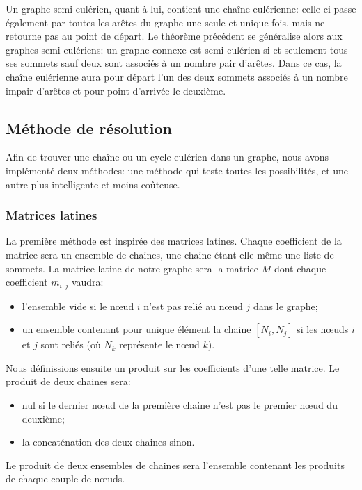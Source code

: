 \documentclass{scrartcl}
\begin{document}
    Un graphe semi-eulérien, quant à lui, contient une chaîne eulérienne:
    celle-ci passe également par toutes les arêtes du graphe une seule et
    unique fois, mais ne retourne pas au point de départ. Le théorème précédent
    se généralise alors aux graphes semi-eulériens: un graphe connexe est
    semi-eulérien si et seulement tous ses sommets sauf deux sont associés à un
    nombre pair d'arêtes. Dans ce cas, la chaîne eulérienne aura pour départ
    l'un des deux sommets associés à un nombre impair d'arêtes et pour point
    d'arrivée le deuxième.

  \subsection{Méthode de résolution}
    Afin de trouver une chaîne ou un cycle eulérien dans un graphe, nous avons
    implémenté deux méthodes: une méthode qui teste toutes les possibilités,
    et une autre plus intelligente et moins coûteuse.

    \subsubsection{Matrices latines}
      La première méthode est inspirée des matrices latines. Chaque coefficient
      de la matrice sera un ensemble de chaines, une chaine étant elle-même une
      liste de sommets. La matrice latine de notre graphe sera la matrice $M$
      dont chaque coefficient $m_{i,j}$ vaudra:
      \begin{itemize}
        \item l'ensemble vide si le nœud $i$ n'est pas relié au nœud $j$ dans
          le graphe;
        \item un ensemble contenant pour unique élément la chaine  $[N_i,N_j]$
          si les nœuds $i$ et $j$ sont reliés (où $N_k$ représente le nœud
          $k$).
      \end{itemize}

      Nous définissions ensuite un produit sur les coefficients d'une telle
      matrice. Le produit de deux chaines sera:
      \begin{itemize}
        \item nul si le dernier nœud de la première chaine n'est pas le premier
          nœud du deuxième;
        \item la concaténation des deux chaines sinon.
      \end{itemize}

      Le produit de deux ensembles de chaines sera l'ensemble contenant les
      produits de chaque couple de nœuds.
\end{document}
